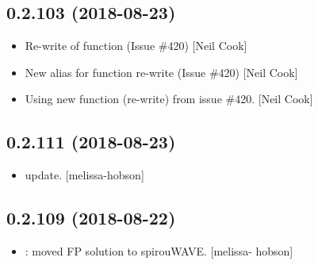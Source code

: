 \documentclass[a4paper,10pt,english]{report}
\begin{document}
\subsection{0.2.103 (2018-08-23)}
\label{\detokenize{misc/changelog:id357}}\begin{itemize}
\item {} 
Re-write of  function (Issue \#420) {[}Neil Cook{]}

\item {} 
New alias for function re-write (Issue \#420) {[}Neil Cook{]}

\item {} 
Using new function (re-write) from issue \#420. {[}Neil Cook{]}

\end{itemize}


\subsection{0.2.111 (2018-08-23)}
\label{\detokenize{misc/changelog:id358}}\begin{itemize}
\item {} 
 update. {[}melissa-hobson{]}

\end{itemize}


\subsection{0.2.109 (2018-08-22)}
\label{\detokenize{misc/changelog:id359}}\begin{itemize}
\item {} 
: moved FP solution to spirouWAVE. {[}melissa-
hobson{]}

\end{itemize}
\end{document}
